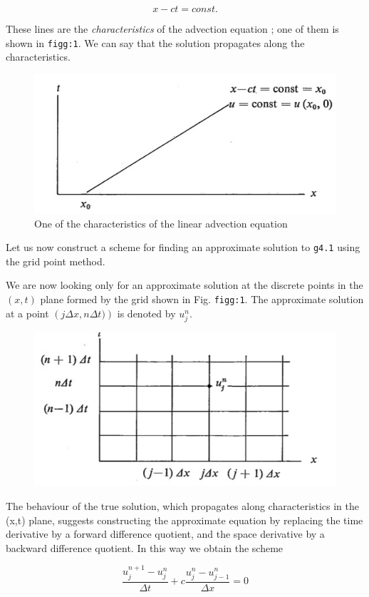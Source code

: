 \[x - ct = const.\]

These lines are the \emph{characteristics} of the advection equation ;
one of them is shown in \texttt{figg:1}. We can say that the solution
propagates along the characteristics.

\begin{figure}
    \centering
    \includegraphics[width = .7 \textwidth]{figs/NM/pic1.jpg}
    \caption{One of the characteristics of the linear advection equation}
    \label{fig:}
\end{figure}

Let us now construct a scheme for finding an approximate solution to
\texttt{g4.1} using the grid point method.

We are now looking only for an approximate solution at the discrete
points in the \((x,t)\) plane formed by the grid shown in Fig.
\texttt{figg:1}. The approximate solution at a point
\(\left( j\Delta x, n\Delta t) \right)\) is denoted by \(u_{j}^{n}\).

\begin{figure}
    \centering
    \includegraphics[width = .7 \textwidth]{figs/NM/pic2.jpg}
    \caption{} \label{fig:}
\end{figure}

The behaviour of the true solution, which propagates along
characteristics in the (x,t) plane, suggests constructing the
approximate equation by replacing the time derivative by a forward
difference quotient, and the space derivative by a backward difference
quotient. In this way we obtain the scheme

    \[\frac{u_{j}^{n + 1} - u_{j}^{n}}{\Delta t} + c\frac{u_j^n - u_{j - 1}^n}{\Delta x} = 0\]

